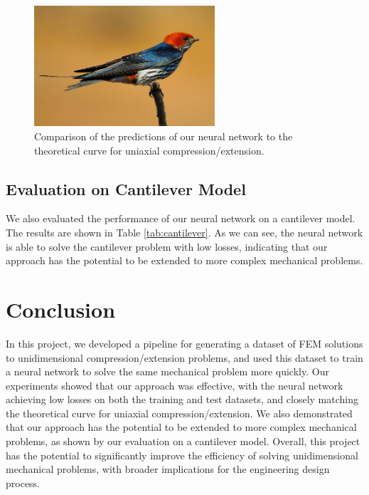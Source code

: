 \documentclass[11pt]{scrartcl} %
\begin{document}
\begin{figure}[h]
\centering
\includegraphics[width=0.6\textwidth]{Figures/swallow.jpg}
\caption{Comparison of the predictions of our neural network to the theoretical curve for uniaxial compression/extension.}
\label{fig:comparison}
\end{figure}

\subsection{Evaluation on Cantilever Model}
We also evaluated the performance of our neural network on a cantilever model. The results are shown in Table \ref{tab:cantilever}. As we can see, the neural network is able to solve the cantilever problem with low losses, indicating that our approach has the potential to be extended to more complex mechanical problems.


\section{Conclusion}
In this project, we developed a pipeline for generating a dataset of FEM solutions to unidimensional compression/extension problems, and used this dataset to train a neural network to solve the same mechanical problem more quickly. Our experiments showed that our approach was effective, with the neural network achieving low losses on both the training and test datasets, and closely matching the theoretical curve for uniaxial compression/extension. We also demonstrated that our approach has the potential to be extended to more complex mechanical problems, as shown by our evaluation on a cantilever model. Overall, this project has the potential to significantly improve the efficiency of solving unidimensional mechanical problems, with broader implications for the engineering design process.
\end{document}

